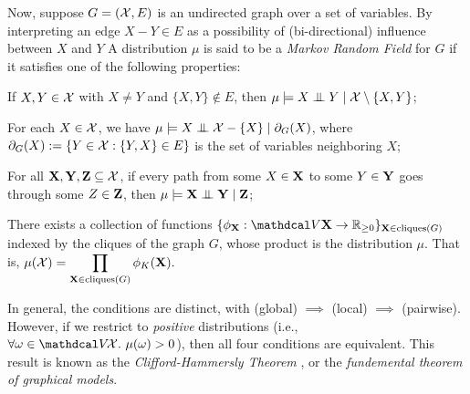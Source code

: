 Now, suppose $G = (\mathcal X, E)$ is an undirected graph over a set of variables.
By interpreting an edge $X{-}Y \in E$ as a possibility of (bi-directional) influence between $X$ and $Y$
A distribution $\mu$ is said to be a \emph{Markov Random Field} for $G$ if it satisfies one of the following properties:

\begin{description}[nosep]
    \item [(pairwise)] 
        If $X,Y \in \mathcal X$ with $X \ne Y$ and $\{X, Y\} \notin E$, then 
        $
        \mu \models
            X \mathrel{\perp\mspace{-10mu}\perp} Y \mid \mathcal X \setminus \{X, Y\}$;
    \item [(local)] 
        For each $X \in \mathcal X$, we have $
            \mu \models
        X \mathrel{\perp\mspace{-10mu}\perp} \mathcal X - \{ X \} \mid \partial_G(X)$,
        where
        $\partial_G(X) := \{ Y \in \mathcal X : \{Y,X\} \in E \}$ is the set of variables neighboring $X$;
    \item [(global)]
        For all $\mathbf X, \mathbf Y, \mathbf Z \subseteq \mathcal X$,
        if every path from some $X \in \mathbf X$ to some $Y \in \mathbf Y$ 
            goes through some $Z \in \mathbf Z$,
        then $
        \mu \models 
        \mathbf X \mathrel{\perp\mspace{-10mu}\perp} \mathbf Y \mid \mathbf Z
        $;
    \item [(factorization)] 
        There exists a collection of functions 
        $\{ \phi_{\mat X} : \V \mat X \to \mathbb R_{\ge 0} \}_{\mat X \in \mathrm{cliques}(G)}$
        indexed by the cliques of the graph $G$,
        whose product is the distribution $\mu$.
        That is,
        $
            \displaystyle
            \mu(\mathcal X) = \prod_{\mathbf X \in \mathrm{cliques}(G)} \phi_K(\mathbf X).
        $
\end{description}

In general, the conditions are distinct, with (global) $\implies$ (local) $\implies$ (pairwise). 
However, if we restrict to \emph{positive} distributions (i.e., $\forall \omega \in \V\!\X.~\mu(\omega) > 0 $), then all four conditions are equivalent.
This result is
known as the \emph{Clifford-Hammersly Theorem} \citep{clifford1971markov}, or the \emph{fundemental theorem of graphical models}. 

